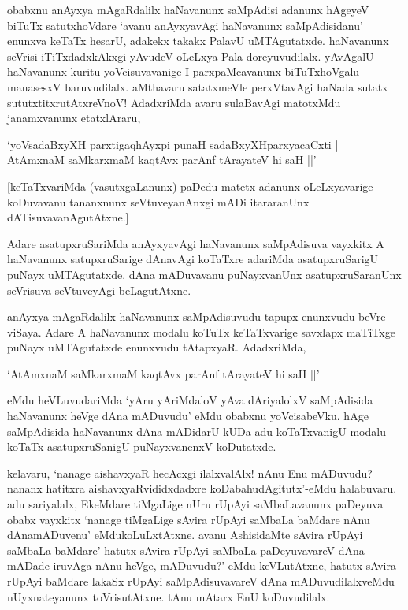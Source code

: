 obabxnu anAyxya mAgaRdalilx haNavanunx saMpAdisi adanunx hAgeyeV biTuTx satutxhoVdare `avanu anAyxyavAgi haNavanunx saMpAdisidanu' enunxva keTaTx hesarU, adakekx takakx PalavU uMTAgutatxde. haNavanunx seVrisi iTiTxdadxkAkxgi yAvudeV oLeLxya Pala doreyuvudilalx. yAvAgalU haNavanunx kuritu yoVcisuvavanige I parxpaMcavanunx biTuTxhoVgalu manasesxV baruvudilalx. aMthavaru satatxmeVle perxVtavAgi haNada sutatx sututxtitxrutAtxreVnoV! AdadxriMda avaru sulaBavAgi matotxMdu janamxvanunx etatxlAraru,

\begin{shloka}
`yoV\s sadaBxyXH parxtigaqhAyxpi punaH sadaBxyXHparxyacaCxti |\\
AtAmxnaM saMkarxmaM kaqtAvx parAnf tArayateV hi saH ||'
\end{shloka}

[keTaTxvariMda (vasutxgaLanunx) paDedu matetx adanunx oLeLxyavarige koDuvavanu tananxnunx seVtuveyanAnxgi mADi itararanUnx dATisuvavanAgutAtxne.]

Adare asatupxruSariMda anAyxyavAgi haNavanunx saMpAdisuva vayxkitx A haNavanunx satupxruSarige dAnavAgi koTaTxre adariMda asatupxruSarigU puNayx uMTAgutatxde. dAna mADuvavanu puNayxvanUnx asatupxruSaranUnx seVrisuva seVtuveyAgi beLagutAtxne.

anAyxya mAgaRdalilx haNavanunx saMpAdisuvudu tapupx enunxvudu beVre viSaya. Adare A haNavanunx modalu koTuTx keTaTxvarige savxlapx maTiTxge puNayx uMTAgutatxde enunxvudu tAtapxyaR. AdadxriMda,

\begin{shloka}
`AtAmxnaM saMkarxmaM kaqtAvx parAnf tArayateV hi saH ||'
\end{shloka}

\noindent eMdu heVLuvudariMda `yAru yAriMdaloV yAva dAriyalolxV saMpAdisida haNavanunx heVge dAna mADuvudu' eMdu obabxnu yoVcisabeVku. hAge saMpAdisida haNavanunx dAna mADidarU kUDa adu koTaTxvanigU modalu koTaTx asatupxruSanigU puNayxvanenxV koDutatxde.

kelavaru, `nanage aishavxyaR hecAcxgi ilalxvalAlx! nAnu Enu mADuvudu? nananx hatitxra aishavxyaRvididxdadxre koDabahudAgitutx'-eMdu halabuvaru. adu sariyalalx, EkeMdare tiMgaLige nUru rUpAyi saMbaLavanunx paDeyuva obabx vayxkitx `nanage tiMgaLige sAvira rUpAyi saMbaLa baMdare nAnu dAnamADuvenu' eMdukoLuLxtAtxne. avanu AshisidaMte sAvira rUpAyi saMbaLa baMdare' hatutx sAvira rUpAyi saMbaLa paDeyuvavareV dAna mADade iruvAga nAnu heVge, mADuvudu?' eMdu keVLutAtxne, hatutx sAvira rUpAyi baMdare lakaSx rUpAyi saMpAdisuvavareV dAna mADuvudilalxveMdu nUyxnateyanunx toVrisutAtxne. tAnu mAtarx EnU koDuvudilalx.

